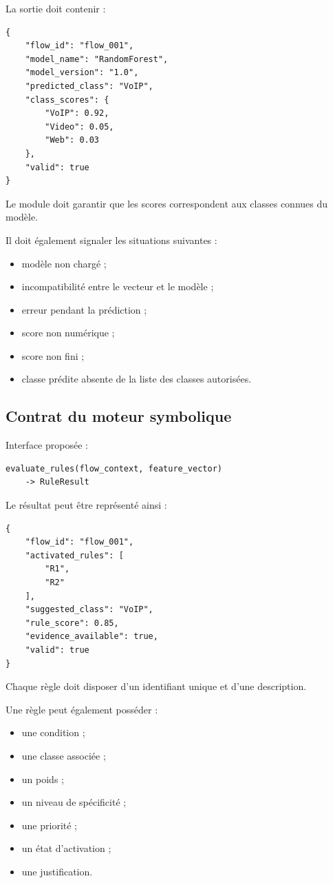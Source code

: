 La sortie doit contenir :

\begin{verbatim}
{
    "flow_id": "flow_001",
    "model_name": "RandomForest",
    "model_version": "1.0",
    "predicted_class": "VoIP",
    "class_scores": {
        "VoIP": 0.92,
        "Video": 0.05,
        "Web": 0.03
    },
    "valid": true
}
\end{verbatim}

Le module doit garantir que les scores correspondent aux classes connues du modèle.

Il doit également signaler les situations suivantes :

\begin{itemize}
    \item modèle non chargé ;
    \item incompatibilité entre le vecteur et le modèle ;
    \item erreur pendant la prédiction ;
    \item score non numérique ;
    \item score non fini ;
    \item classe prédite absente de la liste des classes autorisées.
\end{itemize}

\subsection{Contrat du moteur symbolique}

Interface proposée :

\begin{verbatim}
evaluate_rules(flow_context, feature_vector)
    -> RuleResult
\end{verbatim}

Le résultat peut être représenté ainsi :

\begin{verbatim}
{
    "flow_id": "flow_001",
    "activated_rules": [
        "R1",
        "R2"
    ],
    "suggested_class": "VoIP",
    "rule_score": 0.85,
    "evidence_available": true,
    "valid": true
}
\end{verbatim}

Chaque règle doit disposer d'un identifiant unique et d'une description.

Une règle peut également posséder :

\begin{itemize}
    \item une condition ;
    \item une classe associée ;
    \item un poids ;
    \item un niveau de spécificité ;
    \item une priorité ;
    \item un état d'activation ;
    \item une justification.
\end{itemize}

